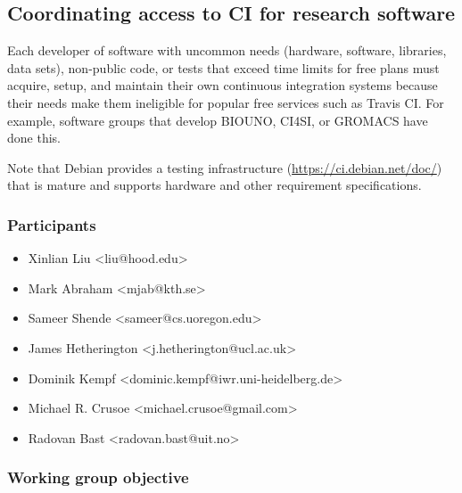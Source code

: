 \subsection{Coordinating access to CI for research software}
\label{sec:access}


Each developer of software with uncommon needs (hardware, software, libraries, data sets), non-public code, or tests that exceed time limits for free plans must acquire, setup, and maintain their own continuous integration systems because their needs make them ineligible for popular free services such as Travis CI.  For example, software groups that develop BIOUNO, CI4SI, or GROMACS have done this.

Note that Debian provides a testing infrastructure (\url{https://ci.debian.net/doc/}) that is mature and supports hardware and other requirement specifications.



\subsubsection{Participants}

\begin{itemize}
  \item Xinlian Liu <liu@hood.edu>
  \item Mark Abraham <mjab@kth.se>
  \item Sameer Shende <sameer@cs.uoregon.edu>
  \item James Hetherington <j.hetherington@ucl.ac.uk>
  \item Dominik Kempf <dominic.kempf@iwr.uni-heidelberg.de>
  \item Michael R. Crusoe <michael.crusoe@gmail.com>
  \item Radovan Bast <radovan.bast@uit.no>
\end{itemize}

\subsubsection{Working group objective}


